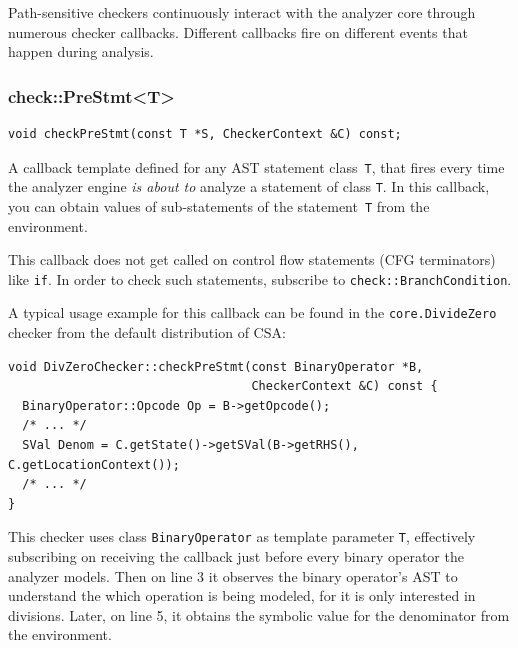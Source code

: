 \documentclass[a4paper,12pt]{article}
\newenvironment{nobr}{\begin{minipage}{\textwidth}\setlength\parskip{1em}
}{\end{minipage}\ignorespacesafterend}
\begin{document}
Path-sensitive checkers continuously interact with the analyzer core through numerous checker callbacks. Different callbacks fire on different events that happen during analysis.

\begin{nobr}
\subsubsection{check::PreStmt<T>}

\begin{lstlisting}[style=cplusplus,numbers=none]
void checkPreStmt(const T *S, CheckerContext &C) const;
\end{lstlisting}

A callback template defined for any AST statement class~\lstinline|T|, that fires every time the analyzer engine \emph{is about to} analyze a statement of class \lstinline|T|. In this callback, you can obtain values of sub-statements of the statement~\lstinline|T| from the environment.
\end{nobr}

This callback does not get called on control flow statements (CFG terminators) like \lstinline|if|. In order to check such statements, subscribe to \lstinline|check::BranchCondition|.

\begin{nobr}
A typical usage example for this callback can be found in the \lstinline|core.DivideZero| checker from the default distribution of CSA:

\begin{lstlisting}[style=cplusplus]
void DivZeroChecker::checkPreStmt(const BinaryOperator *B,
                                  CheckerContext &C) const {
  BinaryOperator::Opcode Op = B->getOpcode();
  /* ... */
  SVal Denom = C.getState()->getSVal(B->getRHS(), C.getLocationContext());
  /* ... */
}
\end{lstlisting}
\end{nobr}

This checker uses class \lstinline|BinaryOperator| as template parameter \lstinline|T|, effectively subscribing on receiving the callback just before every binary operator the analyzer models. Then on line 3 it observes the binary operator's AST to understand the which operation is being modeled, for it is only interested in divisions. Later, on line 5, it obtains the symbolic value for the denominator from the environment.
\end{document}
